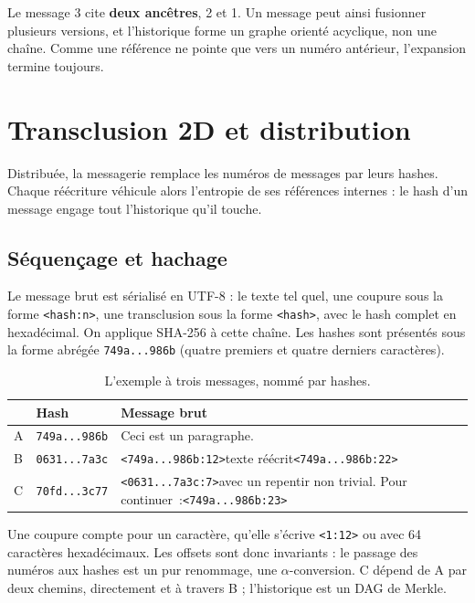 \documentclass[11pt,a4paper]{article}
\newcommand{\cd}[1]{\texttt{#1}}
\begin{document}
Le message 3 cite \textbf{deux ancêtres}, 2 et 1. Un message peut ainsi fusionner plusieurs versions, et l'historique forme un graphe orienté acyclique, non une chaîne. Comme une référence ne pointe que vers un numéro antérieur, l'expansion termine toujours.

\section{Transclusion 2D et distribution}

Distribuée, la messagerie remplace les numéros de messages par leurs hashes. Chaque réécriture véhicule alors l'entropie de ses références internes : le hash d'un message engage tout l'historique qu'il touche.

\subsection{Séquençage et hachage}

Le message brut est sérialisé en UTF-8 : le texte tel quel, une coupure sous la forme \cd{<hash:n>}, une transclusion sous la forme \cd{<hash>}, avec le hash complet en hexadécimal. On applique SHA-256 à cette chaîne. Les hashes sont présentés sous la forme abrégée \cd{749a...986b} (quatre premiers et quatre derniers caractères).

\begin{table}[H]
\centering
\begin{tabularx}{\linewidth}{@{}llL@{}}
\toprule
 & Hash & Message brut \\
\midrule
A & \cd{749a...986b} & Ceci est un paragraphe. \\
B & \cd{0631...7a3c} & \cd{<749a...986b:12>}texte réécrit\cd{<749a...986b:22>} \\
C & \cd{70fd...3c77} & \cd{<0631...7a3c:7>}avec un repentir non trivial. Pour continuer~:\cd{<749a...986b:23>} \\
\bottomrule
\end{tabularx}
\caption{L'exemple à trois messages, nommé par hashes.}
\end{table}

Une coupure compte pour un caractère, qu'elle s'écrive \cd{<1:12>} ou avec 64 caractères hexadécimaux. Les offsets sont donc invariants : le passage des numéros aux hashes est un pur renommage, une $\alpha$-conversion. C dépend de A par deux chemins, directement et à travers B ; l'historique est un DAG de Merkle.
\end{document}
